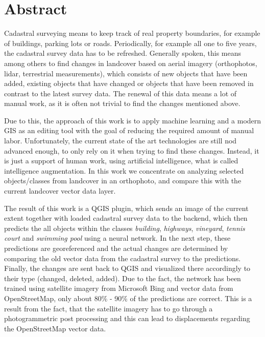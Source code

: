 \cleardoublepage
\markleft{\abstractname}

\chapter*{Abstract}
Cadastral surveying means to keep track of real property boundaries, for example of buildings, parking lots or roads. Periodically, for example all one to five years, the cadastral survey data has to be refreshed. Generally spoken, this means among others to find changes in landcover based on aerial imagery (orthophotos, lidar, terrestrial measurements), which consists of new objects that have been added, existing objects that have changed or objects that have been removed in contrast to the latest survey data. The renewal of this data means a lot of manual work, as it is often not trivial to find the changes mentioned above.

Due to this, the approach of this work is to apply machine learning and a modern GIS as an editing tool with the goal of reducing the required amount of manual labor. Unfortunately, the current state of the art technologies are still nod advanced enough, to only rely on it when trying to find these changes. Instead, it is just a support of human work, using artificial intelligence, what is called intelligence augmentation. In this work we concentrate on analyzing selected objects/classes from landcover in an orthophoto, and compare this with the current landcover vector data layer.

The result of this work is a QGIS plugin, which sends an image of the current extent together with loaded cadastral survey data to the backend, which then predicts the all objects within the classes \textit{building}, \textit{highways}, \textit{vineyard}, \textit{tennis court} and \textit{swimming pool} using a neural network. In the next step, these predictions are georeferenced and the actual changes are determined by comparing the old vector data from the cadastral survey to the predictions. Finally, the changes are sent back to QGIS and visualized there accordingly to their type (changed, deleted, added). Due to the fact, the network has been trained using satellite imagery from Microsoft Bing and vector data from OpenStreetMap, only about 80\% - 90\% of the predictions are correct. This is a result from the fact, that the satellite imagery has to go through a photogrammetric post processing and this can lead to displacements regarding the OpenStreetMap vector data.